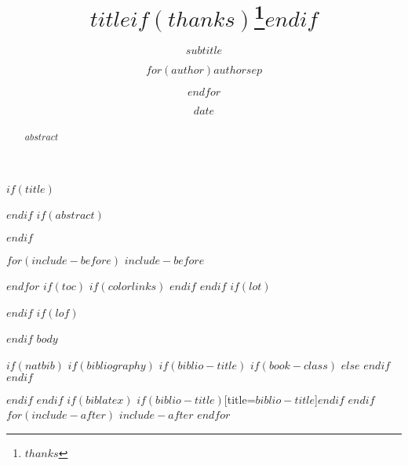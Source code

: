 \documentclass[$if(fontsize)$$fontsize$,$endif$$if(lang)$$babel-lang$,$endif$$if(papersize)$$papersize$paper,$endif$$for(classoption)$$classoption$$sep$,$endfor$]{$documentclass$}
\title{$title$$if(thanks)$\thanks{$thanks$}$endif$}
\subtitle{$subtitle$}
\author{$for(author)$$author$$sep$ \and $endfor$}
\institute{$for(institute)$$institute$$sep$ \and $endfor$}
\date{$date$}
\begin{document}
	$if(title)$
		\maketitle
	$endif$
	$if(abstract)$
		\begin{abstract}
	$abstract$
		\end{abstract}
	$endif$

	$for(include-before)$
	$include-before$

	$endfor$
	$if(toc)${
		$if(colorlinks)$
			\hypersetup{linkcolor=$if(toccolor)$$toccolor$$else$black$endif$}
		$endif$
		\setcounter{tocdepth}{$toc-depth$}
		\tableofcontents
	}
	$endif$
	$if(lot)$
		\listoftables
	$endif$
	$if(lof)$
		\listoffigures
	$endif$
	$body$

	$if(natbib)$
	$if(bibliography)$
	$if(biblio-title)$
	$if(book-class)$
		\renewcommand\bibname{$biblio-title$}
	$else$
		\renewcommand\refname{$biblio-title$}
	$endif$
	$endif$
	

	$endif$
	$endif$
	$if(biblatex)$
		\printbibliography$if(biblio-title)$[title=$biblio-title$]$endif$
	$endif$
	$for(include-after)$
		$include-after$
	$endfor$
\end{document}
